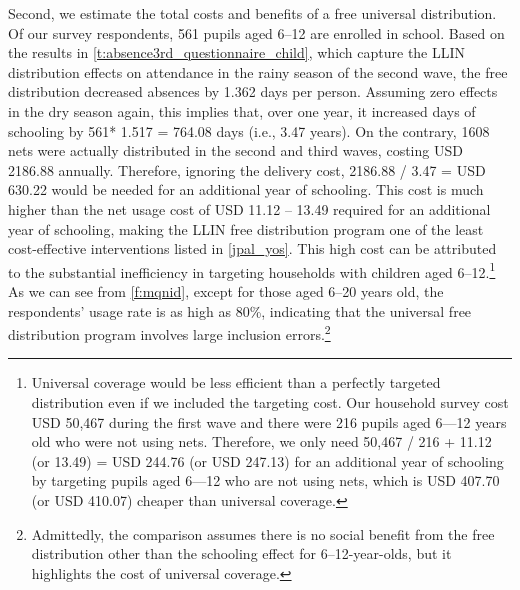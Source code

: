 \documentclass[fleqn,11pt]{article}
\begin{document}

Second, we estimate the total costs and benefits of a free universal distribution. Of our survey respondents, 561 pupils aged 6--12 are enrolled in school. Based on the results in  \autoref{t:absence3rd_questionnaire_child}, which capture the LLIN distribution effects on attendance in the rainy season of the second wave,  the free distribution decreased absences by 1.362 days per person. Assuming zero effects in the dry season again, this implies that, over one year, it increased days of schooling by 561* 1.517  =  764.08  days (i.e., 3.47 years). On the contrary, 1608 nets were actually distributed in the second and third waves, costing USD 2186.88 annually. Therefore, ignoring the delivery cost, 2186.88 / 3.47 = USD 630.22 would be needed for an additional year of schooling. This cost is much higher than the net usage cost of USD 11.12 -- 13.49 required for an additional year of schooling, making the LLIN free distribution program one of the least cost-effective interventions listed in \autoref{jpal_yos}. This high cost can be attributed to the substantial inefficiency in targeting households with children aged 6--12.\footnote{Universal coverage would be less efficient than a perfectly targeted distribution even if we included the targeting cost.
Our household survey cost USD 50,467 during the first wave and there were 216 pupils aged 6—12 years old who were not using nets.
Therefore, we only need 50,467 / 216 + 11.12 (or 13.49) = USD 244.76 (or USD 247.13) for an additional year of schooling by targeting pupils aged 6—12 who are not using nets,
which is USD 407.70 (or USD 410.07) cheaper than universal coverage.} As we can see from \autoref{f:mqnid}, except for those aged 6--20 years old, the respondents' usage rate is as high as 80\%, indicating that the universal free distribution program involves large inclusion errors.\footnote{Admittedly, the comparison assumes there is no social benefit from the free distribution other than the schooling effect for 6--12-year-olds, but it highlights the cost of universal coverage.}
\end{document}
